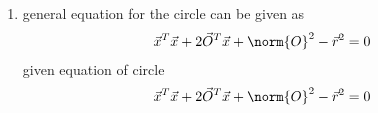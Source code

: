 \renewcommand{\theequation}{\theenumi}
\begin{enumerate}[label=\arabic*.,ref=\thesubsection.\theenumi]

\item general equation for the circle can be given as
\begin{align}
\vec{x}^T\vec{x} + 2\vec{O}^T\vec{x} +\norm{O}^2 - \vec{r}^2 = 0
\end{align}
given equation of circle
\begin{align}
\vec{x}^T\vec{x} + 2\vec{O}^T\vec{x} +\norm{O}^2 - \vec{r}^2 = 0
\end{align} 
\end{enumerate}